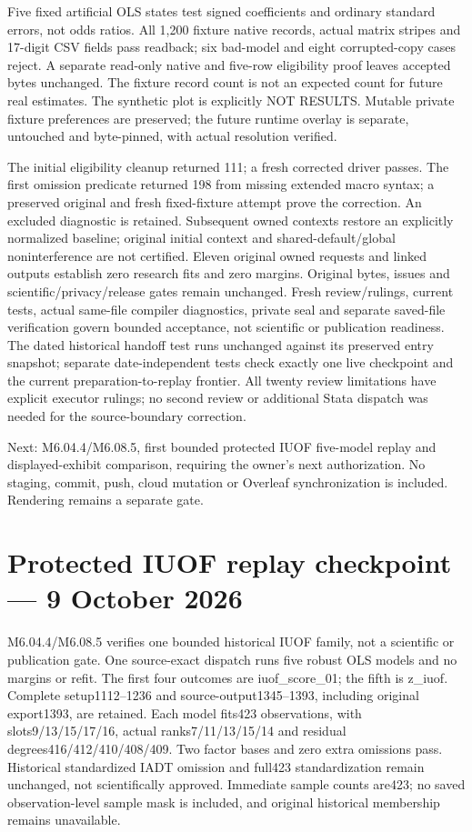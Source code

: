 \documentclass[11pt,a4paper]{article}
\begin{document}
Five fixed artificial OLS states test signed coefficients and ordinary
standard errors, not odds ratios. All 1,200 fixture native records,
actual matrix stripes and 17-digit CSV fields pass readback; six bad-model
and eight corrupted-copy cases reject. A separate read-only native and
five-row eligibility proof leaves accepted bytes unchanged. The fixture
record count is not an expected count for future real estimates.
The synthetic plot is explicitly NOT RESULTS. Mutable private fixture
preferences are preserved; the future runtime overlay is separate,
untouched and byte-pinned, with actual resolution verified.

The initial eligibility cleanup returned 111; a fresh corrected driver
passes. The first omission predicate returned 198 from missing extended
macro syntax; a preserved original and fresh fixed-fixture attempt prove
the correction. An excluded diagnostic is retained. Subsequent owned
contexts restore an explicitly normalized baseline; original initial
context and shared-default/global noninterference are not certified.
Eleven original owned requests and linked outputs establish zero research
fits and zero margins. Original bytes, issues and scientific/privacy/release
gates remain unchanged. Fresh review/rulings, current tests, actual same-file
compiler diagnostics, private seal and separate saved-file verification
govern bounded acceptance, not scientific or publication readiness.
The dated historical handoff test runs unchanged against its preserved
entry snapshot; separate date-independent tests check exactly one live
checkpoint and the current preparation-to-replay frontier. All twenty
review limitations have explicit executor rulings; no second review or
additional Stata dispatch was needed for the source-boundary correction.

Next: M6.04.4/M6.08.5, first bounded protected IUOF five-model replay and
displayed-exhibit comparison, requiring the owner's next authorization.
No staging, commit, push, cloud mutation or Overleaf synchronization is
included. Rendering remains a separate gate.


\section*{Protected IUOF replay checkpoint --- 9 October 2026}
M6.04.4/M6.08.5 verifies one bounded historical IUOF family, not a
scientific or publication gate. One source-exact dispatch runs five robust
OLS models and no margins or refit. The first four outcomes are
iuof\_score\_01; the fifth is z\_iuof. Complete setup1112--1236 and
source-output1345--1393, including original export1393, are retained.
Each model fits423 observations, with slots9/13/15/17/16, actual
ranks7/11/13/15/14 and residual degrees416/412/410/408/409. Two factor
bases and zero extra omissions pass. Historical standardized IADT omission
and full423 standardization remain unchanged, not scientifically approved.
Immediate sample counts are423; no saved observation-level sample mask is
included, and original historical membership remains unavailable.
\end{document}

